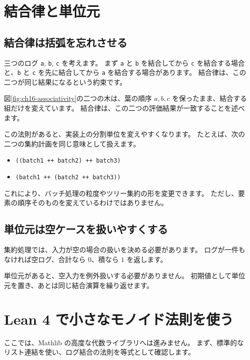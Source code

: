 \section{結合律と単位元}

\subsection{結合律は括弧を忘れさせる}

三つのログ \texttt{a}, \texttt{b}, \texttt{c} を考えます。
まず \texttt{a} と \texttt{b} を結合してから \texttt{c} を結合する場合と、\texttt{b} と \texttt{c} を先に結合してから \texttt{a} を結合する場合があります。
結合律は、この二つが同じ結果になるという約束です。

図\ref{fig:ch16-associativity}の二つの木は、葉の順序 \(a,b,c\) を保ったまま、結合する組だけを変えています。
結合律は、この二つの評価結果が一致することを述べます。


この法則があると、実装上の分割単位を変えやすくなります。
たとえば、次の二つの集約計画を同じ意味として扱えます。

\begin{itemize}
\item \texttt{((batch1 ++ batch2) ++ batch3)}
\item \texttt{(batch1 ++ (batch2 ++ batch3))}
\end{itemize}

これにより、バッチ処理の粒度やツリー集約の形を変更できます。
ただし、要素の順序そのものを変えているわけではありません。

\subsection{単位元は空ケースを扱いやすくする}

集約処理では、入力が空の場合の扱いを決める必要があります。
ログが一件もなければ空ログ、合計なら \(0\)、積なら \(1\) を返します。

単位元があると、空入力を例外扱いする必要がありません。
初期値として単位元を置き、あとは同じ結合演算を繰り返せます。

\section{Lean 4 で小さなモノイド法則を使う}

ここでは、Mathlib の高度な代数ライブラリへは進みません。
まず、標準的なリスト連結を使い、ログ結合の法則を等式として確認します。

